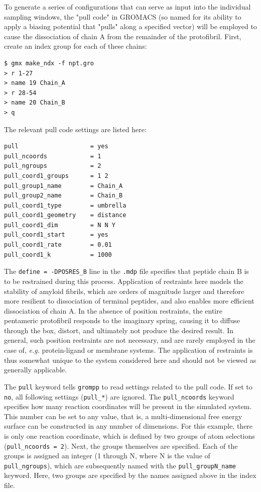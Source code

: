 \documentclass[9pt,tutorial]{livecoms}
\begin{document}
To generate a series of configurations that can serve as input into the individual sampling windows, the "pull code" in GROMACS (so named for its ability to apply a biasing potential that "pulls" along a specified vector) will be employed to cause the dissociation of chain A from the remainder of the protofibril. First, create an index group for each of these chains:

\begin{verbatim}
$ gmx make_ndx -f npt.gro
> r 1-27
> name 19 Chain_A
> r 28-54
> name 20 Chain_B
> q
\end{verbatim}

The relevant pull code settings are listed here:

\begin{verbatim}
pull                    = yes
pull_ncoords            = 1
pull_ngroups            = 2
pull_coord1_groups      = 1 2
pull_group1_name        = Chain_A
pull_group2_name        = Chain_B
pull_coord1_type        = umbrella
pull_coord1_geometry    = distance
pull_coord1_dim         = N N Y
pull_coord1_start       = yes
pull_coord1_rate        = 0.01
pull_coord1_k           = 1000
\end{verbatim}

The \texttt{define = -DPOSRES\_B} line in the \texttt{.mdp} file specifies that peptide chain B is to be restrained during this process. Application of restraints here models the stability of amyloid fibrils, which are orders of magnitude larger and therefore more resilient to dissociation of terminal peptides, and also enables more efficient dissociation of chain A. In the absence of position restraints, the entire pentameric protofibril responds to the imaginary spring, causing it to diffuse through the box, distort, and ultimately not produce the desired result. In general, such position restraints are not necessary, and are rarely employed in the case of, {\em e.g.} protein-ligand or membrane systems. The application of restraints is thus somewhat unique to the system considered here and should not be viewed as generally applicable.

The \texttt{pull} keyword tells \texttt{grompp} to read settings related to the pull code. If set to \texttt{no}, all following settings (\texttt{pull\_*}) are ignored. The \texttt{pull\_ncoords} keyword specifies how many reaction coordinates will be present in the simulated system. This number can be set to any value, that is, a multi-dimensional free energy surface can be constructed in any number of dimensions. For this example, there is only one reaction coordinate, which is defined by two groups of atom selections (\texttt{pull\_ncoords = 2}). Next, the groups themselves are specified. Each of the groups is assigned an integer (1 through N, where N is the value of \texttt{pull\_ngroups}), which are subsequently named with the \texttt{pull\_groupN\_name} keyword. Here, two groups are specified by the names assigned above in the index file.
\end{document}
